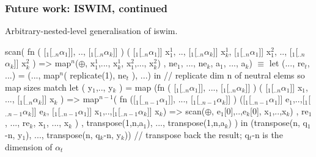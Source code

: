 \documentclass{beamer}
\newcommand{\emp}[1]{\textcolor{DikuRed}{ #1}}
\newcommand{\emphh}[1]{\textcolor{CosGreen}{ #1}}
\newcommand{\mymath}[1]{$ #1 $}
\newcommand{\myindx}[1]{_{#1}}
\newcommand{\myindu}[1]{^{#1}}
\begin{document}
\begin{frame}[fragile,t]
\frametitle{Future work: ISWIM, continued}

Arbitrary-nested-level generalisation of {\sc iswim}.

\begin{colorcode}
\emp{scan}( fn ( [\mymath{\myindx{1}}[\mymath{\myindx{..n}}\mymath{\alpha\myindx{1}}]],    .., [\mymath{\myindx{1}}[\mymath{\myindx{..n}}\mymath{\alpha\myindx{k}}]] )
          ( [\mymath{\myindx{1}}[\mymath{\myindx{..n}}\mymath{\alpha\myindx{1}}]] x\mymath{\myindu{1}\myindx{1}}, .., [\mymath{\myindx{1}}[\mymath{\myindx{..n}}\mymath{\alpha\myindx{k}}]] x\mymath{\myindu{1}\myindx{k}},
            [\mymath{\myindx{1}}[\mymath{\myindx{..n}}\mymath{\alpha\myindx{1}}]] x\mymath{\myindu{2}\myindx{1}}, .., [\mymath{\myindx{1}}[\mymath{\myindx{..n}}\mymath{\alpha\myindx{k}}]] x\mymath{\myindu{2}\myindx{k}} ) =>
                \emphh{map}\mymath{\myindu{n}}(\mymath{\oplus}, x\mymath{\myindu{1}\myindx{1}},..., x\mymath{\myindu{1}\myindx{k}}, x\mymath{\myindu{2}\myindx{1}},..., x\mymath{\myindu{2}\myindx{k}})
     , ne\mymath{\myindx{1}}, ..., ne\mymath{\myindx{k}}, a\mymath{\myindx{1}}, ..., a\mymath{\myindx{k}}) \emphh{\mymath{\equiv}}
let (..., re\mymath{\myindx{t}}, ...) = (..., map\mymath{\myindu{n}}( replicate(1), ne\mymath{\myindx{t}} ), ...) in
// replicate dim n of neutral elems so map sizes match
let ( y\mymath{\myindx{1}},.., y\mymath{\myindx{k}} ) =
  \emphh{map} (fn ( [\mymath{\myindx{1}}[\mymath{\myindx{..n}}\mymath{\alpha\myindx{1}}]], ..., [\mymath{\myindx{1}}[\mymath{\myindx{..n}}\mymath{\alpha\myindx{k}}]] )
           ( [\mymath{\myindx{1}}[\mymath{\myindx{..n}}\mymath{\alpha\myindx{1}}]] x\mymath{\myindx{1}}, ..., [\mymath{\myindx{1}}[\mymath{\myindx{..n}}\mymath{\alpha\myindx{k}}]] x\mymath{\myindx{k}} ) =>
          \emphh{map}\mymath{\myindu{n-1}}( fn ([\mymath{\myindx{1}}[\mymath{\myindx{..n-1}}\mymath{\alpha\myindx{1}}]],  ..., [\mymath{\myindx{1}}[\mymath{\myindx{..n-1}}\mymath{\alpha\myindx{k}}]] )
                      ([\mymath{\myindx{1}}[\mymath{\myindx{..n-1}}\mymath{\alpha\myindx{1}}]] e\mymath{\myindx{1}},..,[\mymath{\myindx{1}}[\mymath{\myindx{..n-1}}\mymath{\alpha\myindx{k}}]] e\mymath{\myindx{k}},
                       [\mymath{\myindx{1}}[\mymath{\myindx{..n-1}}\mymath{\alpha\myindx{1}}]] x\mymath{\myindx{1}},..,[\mymath{\myindx{1}}[\mymath{\myindx{..n-1}}\mymath{\alpha\myindx{k}}]] x\mymath{\myindx{k}})
                     => \emp{scan}(\mymath{\oplus}, e\mymath{\myindx{1}}[0],..,e\mymath{\myindx{k}}[0], x\mymath{\myindx{1}},..,x\mymath{\myindx{k}})
                 , re\mymath{\myindx{1}}, ..., re\mymath{\myindx{k}}, x\mymath{\myindx{1}}, ..., x\mymath{\myindx{k}} )
       , transpose(1,n,a\mymath{\myindx{1}}), ..., transpose(1,n,a\mymath{\myindx{k}}) )
in (transpose(n, q\mymath{\myindx{1}}-n, y\mymath{\myindx{1}}), ..., transpose(n, q\mymath{\myindx{k}}-n, y\mymath{\myindx{k}}))
// transpose back the result; q\mymath{\myindx{t}}-n is the dimension of \mymath{\alpha\myindx{t}}
\end{colorcode}

\end{frame}
\end{document}
